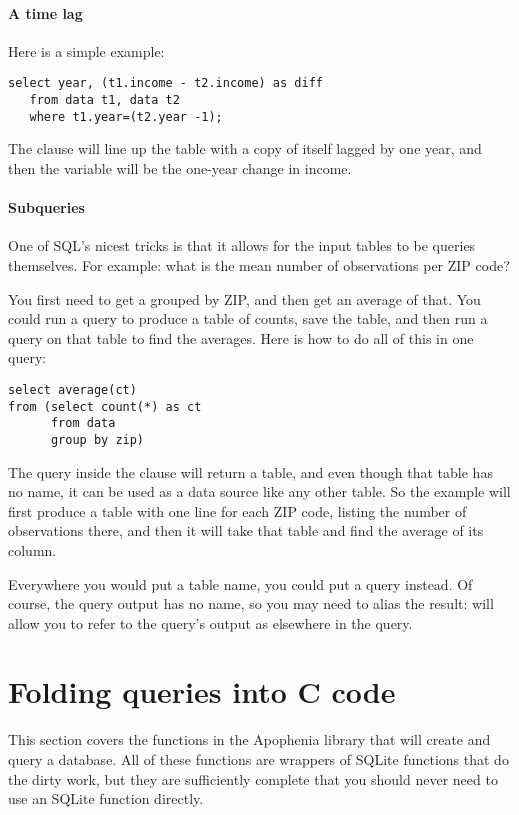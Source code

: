 \paragraph{A time lag} Here is a simple example:
\begin{lstlisting}
select year, (t1.income - t2.income) as diff
   from data t1, data t2
   where t1.year=(t2.year -1);
\end{lstlisting}


The  clause will line up the table with a copy of itself
lagged by one year, and then the  variable will be the
one-year change in income.


\paragraph{Subqueries} 
One of SQL's nicest tricks is that it allows for the input tables to be
queries themselves. For example: what is the mean number of observations per
ZIP code?

You first need to get a  grouped by ZIP, and then get an
average of that. You could run a query to produce a table of counts,
save the table, and then run a query on that table to find the averages.
Here is how to do all of this in one query: 
\begin{lstlisting}
select average(ct) 
from (select count(*) as ct
      from data
      group by zip)
\end{lstlisting}
The query inside the  clause will return a table, and even
though that table has no name, it can be used as a data source like any other
table. So the example will first produce a table with one line for each
ZIP code, listing the number of observations there, and then it will
take that table and find the average of its  column.

Everywhere you would put a table name, you could put a query 
instead. Of course, the query output has no name, so you may need to
alias the result:  will allow you to refer to
the query's output as  elsewhere in the query.

\section{Folding queries into C code}\label{foldingsql}  This section covers the functions
in the Apophenia library that will create and query a database. All of
these functions are wrappers of SQLite functions that do the dirty work,
but they are sufficiently complete that you should never need to use an
SQLite function directly.

